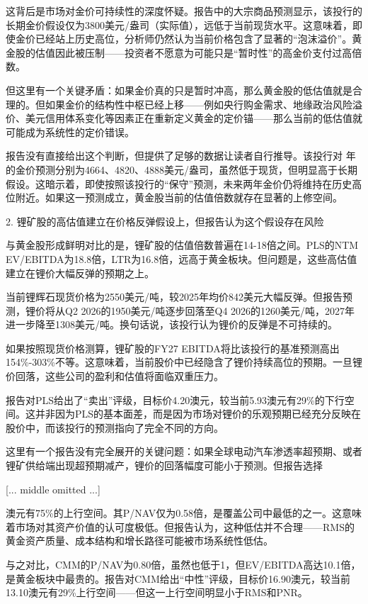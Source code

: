 \documentclass[11pt]{ctexart}
\begin{document}
这背后是市场对金价可持续性的深度怀疑。报告中的大宗商品预测显示，该投行的长期金价假设仅为3800美元/盎司（实际值），远低于当前现货水平。这意味着，即使金价已经站上历史高位，分析师仍然认为当前价格包含了显著的“泡沫溢价”。黄金股的估值因此被压制——投资者不愿意为可能只是“暂时性”的高金价支付过高倍数。

但这里有一个关键矛盾：如果金价真的只是暂时冲高，那么黄金股的低估值就是合理的。但如果金价的结构性中枢已经上移——例如央行购金需求、地缘政治风险溢价、美元信用体系变化等因素正在重新定义黄金的定价锚——那么当前的低估值就可能成为系统性的定价错误。

报告没有直接给出这个判断，但提供了足够的数据让读者自行推导。该投行对 年的金价预测分别为4664、4820、4888美元/盎司，虽然低于现货，但明显高于长期假设。这暗示着，即使按照该投行的“保守”预测，未来两年金价仍将维持在历史高位附近。如果这一预测成立，黄金股当前的估值倍数就存在显著的上修空间。

2. 锂矿股的高估值建立在价格反弹假设上，但报告认为这个假设存在风险

与黄金股形成鲜明对比的是，锂矿股的估值倍数普遍在14-18倍之间。PLS的NTM EV/EBITDA为18.8倍，LTR为16.8倍，远高于黄金板块。但问题是，这些高估值建立在锂价大幅反弹的预期之上。

当前锂辉石现货价格为2550美元/吨，较2025年均价842美元大幅反弹。但报告预测，锂价将从Q2 2026的1950美元/吨逐步回落至Q4 2026的1260美元/吨，2027年进一步降至1308美元/吨。换句话说，该投行认为锂价的反弹是不可持续的。

如果按照现货价格测算，锂矿股的FY27 EBITDA将比该投行的基准预测高出154\%-303\%不等。这意味着，当前股价中已经隐含了锂价持续高位的预期。一旦锂价回落，这些公司的盈利和估值将面临双重压力。

报告对PLS给出了“卖出”评级，目标价4.20澳元，较当前5.93澳元有29\%的下行空间。这并非因为PLS的基本面差，而是因为市场对锂价的乐观预期已经充分反映在股价中，而该投行的预测指向了完全不同的方向。

这里有一个报告没有完全展开的关键问题：如果全球电动汽车渗透率超预期、或者锂矿供给端出现超预期减产，锂价的回落幅度可能小于预测。但报告选择

[... middle omitted ...]

澳元有75\%的上行空间。其P/NAV仅为0.58倍，是覆盖公司中最低的之一。这意味着市场对其资产价值的认可度极低。但报告认为，这种低估并不合理——RMS的黄金资产质量、成本结构和增长路径可能被市场系统性低估。

与之对比，CMM的P/NAV为0.80倍，虽然也低于1，但EV/EBITDA高达10.1倍，是黄金板块中最贵的。报告对CMM给出“中性”评级，目标价16.90澳元，较当前13.10澳元有29\%上行空间——但这一上行空间明显小于RMS和PNR。
\end{document}
